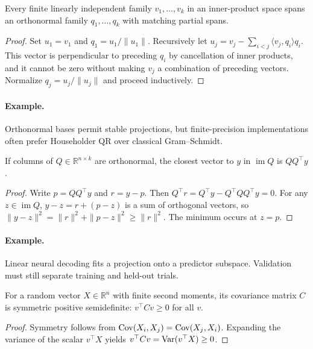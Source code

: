 \begin{theorem}Every finite linearly independent family $v_1,\ldots,v_k$ in an inner-product space spans an orthonormal family $q_1,\ldots,q_k$ with matching partial spans.\end{theorem}
\begin{proof}Set $u_1=v_1$ and $q_1=u_1/\|u_1\|$. Recursively let $u_j=v_j-\sum_{i<j}\langle v_j,q_i\rangle q_i$. This vector is perpendicular to preceding $q_i$ by cancellation of inner products, and it cannot be zero without making $v_j$ a combination of preceding vectors. Normalize $q_j=u_j/\|u_j\|$ and proceed inductively.\end{proof}
\paragraph{Example.} Orthonormal bases permit stable projections, but finite-precision implementations often prefer Householder QR over classical Gram--Schmidt.

\begin{proposition}If columns of $Q\in\mathbb R^{n\times k}$ are orthonormal, the closest vector to $y$ in $\operatorname{im}Q$ is $QQ^\top y$.\end{proposition}
\begin{proof}Write $p=QQ^\top y$ and $r=y-p$. Then $Q^\top r=Q^\top y-Q^\top QQ^\top y=0$. For any $z\in\operatorname{im}Q$, $y-z=r+(p-z)$ is a sum of orthogonal vectors, so $\|y-z\|^2=\|r\|^2+\|p-z\|^2\geq\|r\|^2$. The minimum occurs at $z=p$.\end{proof}
\paragraph{Example.} Linear neural decoding fits a projection onto a predictor subspace. Validation must still separate training and held-out trials.

\begin{proposition}For a random vector $X\in\mathbb R^n$ with finite second moments, its covariance matrix $C$ is symmetric positive semidefinite: $v^\top Cv\geq0$ for all $v$.\end{proposition}
\begin{proof}Symmetry follows from $\operatorname{Cov}(X_i,X_j)=\operatorname{Cov}(X_j,X_i)$. Expanding the variance of the scalar $v^\top X$ yields $v^\top Cv=\operatorname{Var}(v^\top X)\geq0$.\end{proof}
